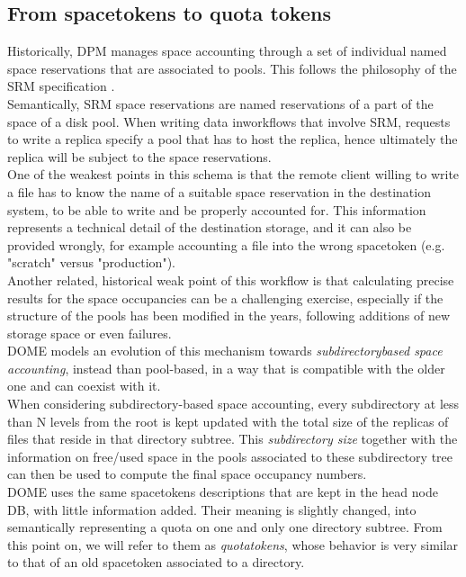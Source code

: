 \documentclass[a4paper]{jpconf}
\begin{document}
\subsection{From spacetokens to quota tokens}
Historically, DPM manages space accounting through a set of individual named space reservations that are associated to pools. This follows the
philosophy of the SRM specification \cite{srm}.\\
Semantically, SRM space reservations are named reservations of a part of the space of a disk pool. When  writing data
inworkflows that involve SRM, requests to write a replica specify a pool
that has to host the replica, hence ultimately the replica will be subject to the space reservations.\\

One of the weakest points in this schema is that the remote client willing to write a file
has to know the name of a suitable space reservation in the destination system, to be able to write
and be properly accounted for. This information represents a technical detail
of the destination storage, and it can also  be provided wrongly, for example accounting
a file into the wrong spacetoken (e.g. "scratch" versus "production").\\

Another related, historical weak point of this workflow is that calculating precise results for the space occupancies can be a challenging exercise,
especially if the structure of the pools has been modified in the years, following additions of new storage space or
even failures.\\
DOME models an evolution of this mechanism towards \textit{subdirectory\-based space accounting}, instead than pool-based, in a way
that is compatible with the older one and can coexist with it.\\

When considering subdirectory-based space accounting, every subdirectory at less than N levels from the root is kept
updated with the total size of the replicas of files that reside in that directory subtree.
This \textit{subdirectory size} together with the information on free/used space in the pools associated to these subdirectory tree
can then be used to compute the final space occupancy numbers.\\

DOME uses the same spacetokens descriptions that are kept in the head node DB, with little information added. Their meaning is slightly changed,
into semantically representing a quota on one and only one directory subtree. From this point on, we will refer to them as \textit{quotatokens},
whose behavior is very similar to that of an old spacetoken associated to a directory.\\
\end{document}

